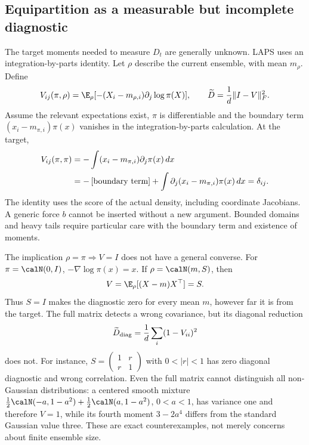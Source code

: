 \subsection{Equipartition as a measurable but incomplete diagnostic}

The target moments needed to measure $D_t$ are generally unknown. LAPS uses
an integration-by-parts identity. Let $\rho$ describe the current ensemble,
with mean $m_\rho$. Define
\begin{equation}
 V_{ij}(\pi,\rho)
 =\E_\rho[-(X_i-m_{\rho,i})\partial_j\log\pi(X)],\qquad
 \widetilde D=\frac1d\|I-V\|_F^2.
 \label{eq:bf-modern-equipartition}
\end{equation}
Assume the relevant expectations exist, $\pi$ is differentiable and the
boundary term $(x_i-m_{\pi,i})\pi(x)$ vanishes in the integration-by-parts
calculation. At the target,
\begin{align}
 V_{ij}(\pi,\pi)
 &=-\int(x_i-m_{\pi,i})\partial_j\pi(x)\,dx\\
 &=-\left[\hbox{boundary term}\right]
      +\int\partial_j(x_i-m_{\pi,i})\pi(x)\,dx
   =\delta_{ij}.
 \label{eq:bf-modern-equipartition-proof}
\end{align}
The identity uses the score of the actual density, including coordinate
Jacobians. A generic force $b$ cannot be inserted without a new argument.
Bounded domains and heavy tails require particular care with the boundary
term and existence of moments.

The implication $\rho=\pi\Rightarrow V=I$ does not have a general converse.
For $\pi=\calN(0,I)$, $-\nabla\log\pi(x)=x$. If
$\rho=\calN(m,S)$, then
\begin{equation}
 V=\E_\rho[(X-m)X^\top]=S.
 \label{eq:bf-modern-equipartition-gaussian}
\end{equation}
Thus $S=I$ makes the diagnostic zero for every mean $m$, however far it is
from the target. The full matrix detects a wrong covariance, but its
diagonal reduction
\begin{equation}
 \widetilde D_{\rm diag}=\frac1d\sum_i(1-V_{ii})^2
 \label{eq:bf-modern-equipartition-diagonal}
\end{equation}
does not. For instance, $S=\left(\begin{smallmatrix}1&r\\r&1\end{smallmatrix}\right)$
with $0<|r|<1$ has zero diagonal diagnostic and wrong correlation. Even the
full matrix cannot distinguish all non-Gaussian distributions: a centered
smooth mixture
$\tfrac12\calN(-a,1-a^2)+\tfrac12\calN(a,1-a^2)$, $0<a<1$, has variance
one and therefore $V=1$, while its fourth moment
$3-2a^4$ differs from the standard Gaussian value three. These are exact
counterexamples, not merely concerns about finite ensemble size.


